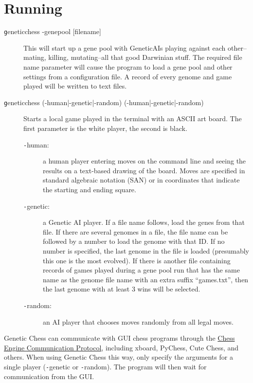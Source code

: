 \documentclass[letter]{article}
\newcommand{\code}[1]{{\texttt #1}}
\renewcommand\_{\textunderscore\allowbreak}
\begin{document}
\section{Running}
\begin{description}
	\item[\code{genetic\_chess -genepool [file\_name]}]
This will start up a gene pool with Genetic\_AIs playing against each other--mating, killing, mutating--all that good Darwinian stuff. The required file name parameter will cause the program to load a gene pool and other settings from a configuration file. A record of every genome and game played will be written to text files.

	\item[\code{genetic\_chess (-human|-genetic|-random) (-human|-genetic|-random)}]
Starts a local game played in the terminal with an ASCII art board. The first parameter is the white player, the second is black.
	\begin{description}
		\item[\code{-human}:] a human player entering moves on the command line and seeing the results on a text-based drawing of the board. Moves are specified in standard algebraic notation (SAN) or in coordinates that indicate the starting and ending square. 
		\item[\code{-genetic}:] a Genetic AI player. If a file name follows, load the genes from that file. If there are several genomes in a file, the file name can be followed by a number to load the genome with that ID. If no number is specified, the last genome in the file is loaded (presumably this one is the most evolved). If there is another file containing records of games played during a gene pool run that has the same name as the genome file name with an extra suffix ``\_games.txt'', then the last genome with at least 3 wins will be selected.
		\item[\code{-random}:] an AI player that chooses moves randomly from all legal moves.
	\end{description}
\end{description}
Genetic Chess can communicate with GUI chess programs through the \href{https://www.gnu.org/software/xboard/engine-intf.html}{Chess Engine Communication Protocol}, including xboard, PyChess, Cute Chess, and others. When using Genetic Chess this way, only specify the arguments for a single player (\code{-genetic} or \code{-random}). The program will then wait for communication from the GUI.
\end{document}
